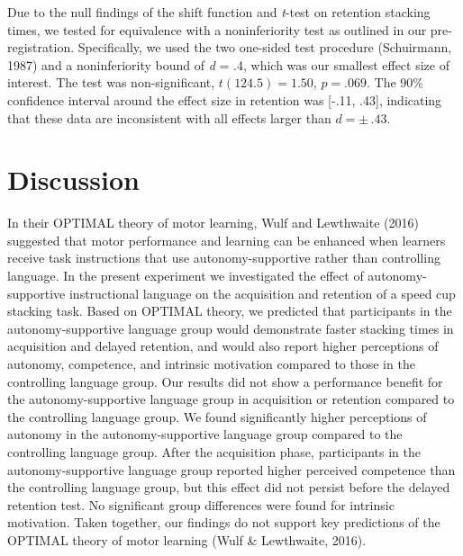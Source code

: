 \documentclass[
  doc, donotrepeattitle,floatsintext]{apa7}
\begin{document}
Due to the null findings of the shift function and \emph{t}-test on retention stacking times, we tested for equivalence with a noninferiority test as outlined in our pre-registration. Specifically, we used the two one-sided test procedure (Schuirmann, 1987) and a noninferiority bound of \emph{d} = .4, which was our smallest effect size of interest. The test was non-significant, \(t(124.5) = 1.50\), \(p = .069\). The 90\% confidence interval around the effect size in retention was {[}-.11, .43{]}, indicating that these data are inconsistent with all effects larger than \(d = \pm\,.43\).

\hypertarget{discussion}{%
\section{Discussion}\label{discussion}}

In their OPTIMAL theory of motor learning, Wulf and Lewthwaite (2016) suggested that motor performance and learning can be enhanced when learners receive task instructions that use autonomy-supportive rather than controlling language. In the present experiment we investigated the effect of autonomy-supportive instructional language on the acquisition and retention of a speed cup stacking task. Based on OPTIMAL theory, we predicted that participants in the autonomy-supportive language group would demonstrate faster stacking times in acquisition and delayed retention, and would also report higher perceptions of autonomy, competence, and intrinsic motivation compared to those in the controlling language group. Our results did not show a performance benefit for the autonomy-supportive language group in acquisition or retention compared to the controlling language group. We found significantly higher perceptions of autonomy in the autonomy-supportive language group compared to the controlling language group. After the acquisition phase, participants in the autonomy-supportive language group reported higher perceived competence than the controlling language group, but this effect did not persist before the delayed retention test. No significant group differences were found for intrinsic motivation. Taken together, our findings do not support key predictions of the OPTIMAL theory of motor learning (Wulf \& Lewthwaite, 2016).
\end{document}
